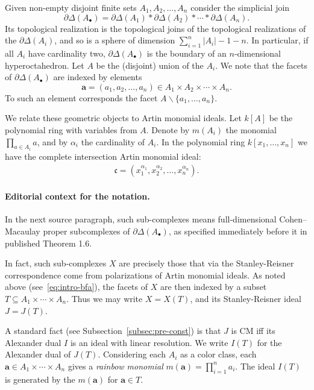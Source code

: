 \documentclass[10pt,a4paper]{article}
\theoremstyle{definition}
\theoremstyle{remark}
\theoremstyle{plain}
\newcommand{\pd}{\partial}
\newcommand{\vardel}{\partial}
\newcommand{\sus}{\subseteq}
\newcommand{\bfa}{{\mathbf a}}
\newcommand{\ic}{{\mathfrak c}}
\newcommand{\Ab}{A_\bullet}
\newcommand{\Delst}{\vardel \Delta}
\begin{document}
\setcounter{equation}{0}

Given non-empty disjoint
finite sets $A_1, A_2, \ldots, A_n$ consider the simplicial join
\begin{equation*}
  \Delst(\Ab) = \pd \Delta(A_1) * \pd \Delta(A_2) * \cdots * \pd \Delta(A_n).
 \end{equation*}
 Its topological realization is the topological joins of the
 topological realizations of the $\pd \Delta(A_i)$,
 and so is a sphere of dimension $\sum_{i = 1}^n |A_i| - 1 - n$.
 In particular, if all $A_i$ have cardinality two, $\Delst(\Ab)$
 is the boundary of an $n$-dimensional hyperoctahedron.
 Let $A$ be the (disjoint) union of the $A_i$. We note that the facets
 of $\Delst(\Ab)$ are indexed by elements
 \begin{equation} \label{eq:intro-bfa}
   \bfa = (a_1, a_2, \ldots, a_n)  \in A_1 \times A_2 \times
   \cdots \times A_n.
   \end{equation}
 To such an element corresponds the facet $A \backslash \{a_1, \ldots, a_n\}$. 

  We relate these geometric objects to Artin monomial ideals.
 Let $k[A]$ be the
 polynomial ring with variables from $A$. Denote by $m(A_i)$
 the monomial $\prod_{a \in A_i} a$, and by $\alpha_i$  the cardinality of $A_i$. 
In the polynomial ring $k[x_1, \ldots, x_n]$ we have the complete
 intersection Artin monomial ideal:
 \begin{align*}
   \ic = (x_1^{\alpha_1}, x_2^{\alpha_2}, \ldots, x_n^{\alpha_n}).
 \end{align*}

\paragraph{Editorial context for the notation.} In the next source paragraph, such sub-complexes means full-dimensional Cohen--Macaulay proper subcomplexes of $\Delst(\Ab)$, as specified immediately before it in published Theorem 1.6.

In fact, such sub-complexes $X$ are precisely those that via the
Stanley-Reisner correspondence come from polarizations of Artin
monomial ideals. 
As noted above
  (see~\eqref{eq:intro-bfa}), the facets of
  $X$ are then indexed by a subset $T \sus A_1 \times \cdots \times A_n$.
  Thus we may write $X = X(T)$, and its Stanley-Reisner ideal $J = J(T)$.

  A standard fact (see Subsection~\ref{subsec:pre-const})
  is that $J$ is CM iff its Alexander dual $I$ is an ideal with linear
  resolution. We write $I(T)$ for the Alexander dual of $J(T)$. 
    Considering each $A_i$ as a color class, each
  $\bfa \in A_1 \times \cdots \times A_n$ gives
  a {\it rainbow monomial} $m(\bfa) = \prod_{i=1}^n a_i$.
  The ideal $I(T)$ is generated by the $m(\bfa)$ for $\bfa \in T$.
\end{document}
